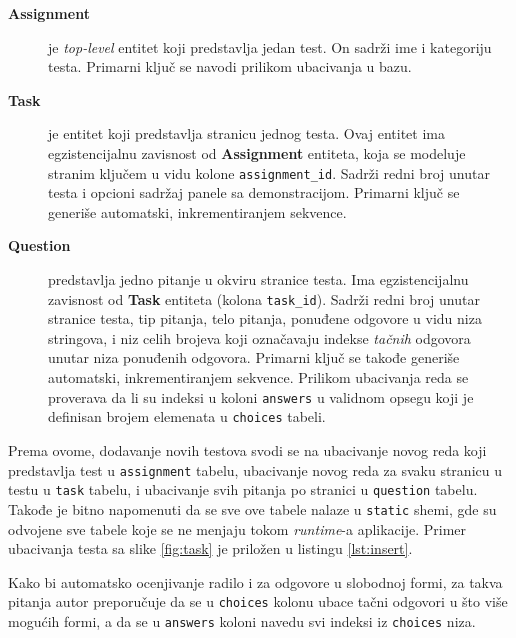 \begin{description}
\item [\textbf{Assignment}] je \textit{top-level} entitet koji predstavlja jedan test. On sadrži ime i kategoriju testa. Primarni ključ se navodi prilikom ubacivanja u bazu.
\item [\textbf{Task}] je entitet koji predstavlja stranicu jednog testa. Ovaj entitet ima egzistencijalnu zavisnost od \textbf{Assignment} entiteta, koja se modeluje stranim ključem u vidu kolone \texttt{assignment\_id}. Sadrži redni broj unutar testa i opcioni sadržaj panele sa demonstracijom. Primarni ključ se generiše automatski, inkrementiranjem sekvence.
\item [\textbf{Question}] predstavlja jedno pitanje u okviru stranice testa. Ima egzistencijalnu zavisnost od \textbf{Task} entiteta (kolona \texttt{task\_id}). Sadrži redni broj unutar stranice testa, tip pitanja, telo pitanja, ponuđene odgovore u vidu niza stringova, i niz celih brojeva koji označavaju indekse \emph{tačnih} odgovora unutar niza ponuđenih odgovora. Primarni ključ se takođe generiše automatski, inkrementiranjem sekvence. Prilikom ubacivanja reda se proverava da li su indeksi u koloni \texttt{answers} u validnom opsegu koji je definisan brojem elemenata u \texttt{choices} tabeli.
\end{description}

Prema ovome, dodavanje novih testova svodi se na ubacivanje novog reda koji predstavlja test u \texttt{assignment} tabelu, ubacivanje novog reda za svaku stranicu u testu u \texttt{task} tabelu, i ubacivanje svih pitanja po stranici u \texttt{question} tabelu. Takođe je bitno napomenuti da se sve ove tabele nalaze u \texttt{static} shemi, gde su odvojene sve tabele koje se ne menjaju tokom \textit{runtime}-a aplikacije. Primer ubacivanja testa sa slike \ref{fig:task} je priložen u listingu \ref{lst:insert}.


Kako bi automatsko ocenjivanje radilo i za odgovore u slobodnoj formi, za takva pitanja autor preporučuje da se u \texttt{choices} kolonu ubace tačni odgovori u što više mogućih formi, a da se u \texttt{answers} koloni navedu svi indeksi iz \texttt{choices} niza.
